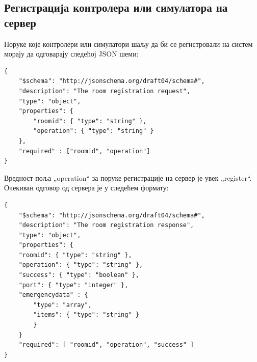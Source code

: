 \documentclass[a4paper, 12pt, diplomski]{etfcyr}
\def\quote#1{„#1“}
\begin{document}
			\subsection{Регистрација контролера или симулатора на сервер}
				\begin{justify}
					Поруке које контролери или симулатори шаљу да би се регистровали на систем морају да одговарају следећој JSON шеми:
					\begin{lstlisting}[caption=Формат захтева за регистрацију]
{
	"$schema": "http://json­schema.org/draft­04/schema#",
	"description": "The room registration request",
	"type": "object",
	"properties": {
		"room­id": { "type": "string" },
		"operation": { "type": "string" }
	},
	"required" : ["room­id", "operation"]
}
					\end{lstlisting}
					Вредност поља \quote{operation} за поруке регистрације на сервер је увек \quote{register}.
					Очекиван одговор од сервера је у следећем формату:
					\begin{lstlisting}[caption=Формат одговора на захтев за регистрацију]
{
	"$schema": "http://json­schema.org/draft­04/schema#",
	"description": "The room registration response",
	"type": "object",
	"properties": {
	"room­id": { "type": "string" },
	"operation": { "type": "string" },
	"success": { "type": "boolean" },
	"port": { "type": "integer" },
	"emergency­data" : {
		"type": "array",
		"items": { "type": "string" }
		}
	}
	"required": [ "room­id", "operation", "success" ]
}
					\end{lstlisting}
				\end{justify}

			\newpage
\end{document}
